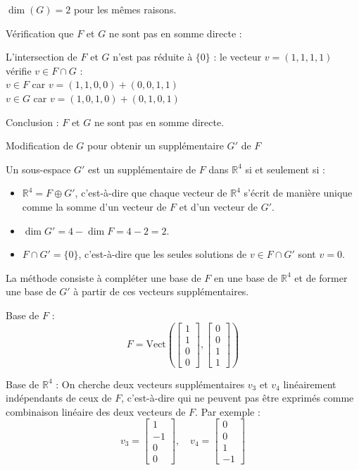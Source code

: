 \documentclass[10pt,a4paper]{article}
\begin{document}
\( \dim(G) = 2 \) pour les mêmes raisons.

\q Vérification que $F$ et $G$ ne sont pas en somme directe :

L'intersection de \( F \) et \( G \) n'est pas réduite à \(\{0\}\) : le vecteur \( v = (1, 1, 1, 1)
\) vérifie \( v \in F \cap G \) :\\
\( v \in F \) car \( v = (1, 1, 0, 0) + (0, 0, 1, 1) \)\\
\( v \in G \) car \( v = (1, 0, 1, 0) + (0, 1, 0, 1) \)

Conclusion : \( F \) et \( G \) ne sont pas en somme directe.

\q Modification de \( G \) pour obtenir un supplémentaire \( G' \) de \( F \)

Un sous-espace \( G' \) est un supplémentaire de \( F \) dans \( \mathbb{R}^4 \) si et seulement si
:
\begin{itemize}
    \item \( \mathbb{R}^4 = F \oplus G' \), c'est-à-dire que chaque vecteur de \( \mathbb{R}^4 \)
    s'écrit de manière unique comme la somme d'un vecteur de \( F \) et d'un vecteur de \( G' \).
    \item \( \dim G' = 4 - \dim F = 4 - 2 = 2 \).
    \item \( F \cap G' = \{0\} \), c'est-à-dire que les seules solutions de \( v \in F \cap G' \)
    sont \( v = 0 \).
\end{itemize}

La méthode consiste à compléter une base de \( F \) en une base de \( \mathbb{R}^4 \) et de former
une base de \( G' \) à partir de ces vecteurs supplémentaires.

Base de \( F \) :
\[
F = \text{Vect} \left( \begin{bmatrix} 1 \\ 1 \\ 0 \\ 0 \end{bmatrix}, \begin{bmatrix} 0 \\ 0 \\ 1 \\ 1 \end{bmatrix} \right)
\]

Base de \( \mathbb{R}^4 \) : On cherche deux vecteurs supplémentaires \( v_3 \) et \( v_4 \)
linéairement indépendants de ceux de \( F \), c'est-à-dire qui ne peuvent pas être exprimés comme
combinaison linéaire des deux vecteurs de \( F \). Par exemple :
\[
v_3 = \begin{bmatrix} 1 \\ -1 \\ 0 \\ 0 \end{bmatrix}, \quad v_4 = \begin{bmatrix} 0 \\ 0 \\ 1 \\ -1 \end{bmatrix}
\]
\end{document}
